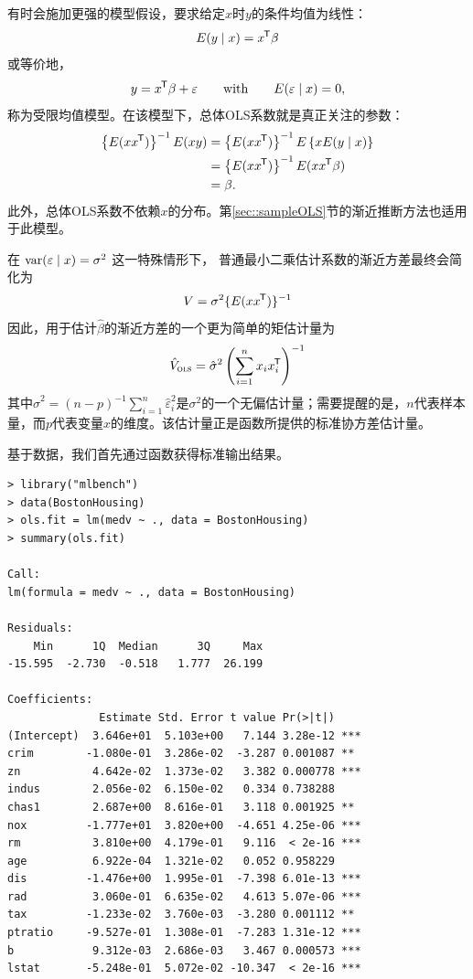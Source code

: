 有时会施加更强的模型假设，要求给定$x$时$y$的条件均值为线性：$$
E(y\mid x)=x ^{\mkern-1.5mu\mathsf{T}} \beta
$$或等价地，\[
y=x ^{\mkern-1.5mu\mathsf{T}} \beta+\varepsilon \qquad  \text{with} \qquad  E(\varepsilon\mid x)=0,
\]称为受限均值模型。在该模型下，总体OLS系数就是真正关注的参数：\begin{align*}
\left\{ E(xx ^{\mkern-1.5mu\mathsf{T}} )\right\} ^{-1}E(xy) & =\left\{ E(xx ^{\mkern-1.5mu\mathsf{T}} )\right\} ^{-1}E\left\{ xE(y\mid x)\right\} \\
 & =\left\{ E(xx ^{\mkern-1.5mu\mathsf{T}} )\right\} ^{-1}E(xx ^{\mkern-1.5mu\mathsf{T}} \beta)\\
 & =\beta.
\end{align*}此外，总体OLS系数不依赖$x$的分布。第\ref{sec::sampleOLS}节的渐近推断方法也适用于此模型。 



在 $\textup{var}(\varepsilon \mid x) = \sigma^2$ 这一特殊情形下， 
普通最小二乘估计系数的渐近方差最终会简化为$$
V = \sigma^2 \{ E(xx ^{\mkern-1.5mu\mathsf{T}} ) \}^{-1}
$$因此，用于估计$\hat{\beta}$的渐近方差的一个更为简单的矩估计量为\begin{equation}
\hat{V}_\textsc{ols} = \hat\sigma^2 \left( \sum_{i=1}^n x_{i}x_{i} ^{\mkern-1.5mu\mathsf{T}} \right)^{-1}
\label{eq::v-hat-ols}
\end{equation}其中$\hat\sigma^2 =  (n-p)^{-1}  \sum_{i=1}^n \hat{\varepsilon}_i^2$是$\sigma^2$的一个无偏估计量；需要提醒的是，$n$代表样本量，而$p$代表变量$x$的维度。该估计量正是函数所提供的标准协方差估计量。 




基于数据，我们首先通过函数获得标准输出结果。 

\begin{lstlisting}
> library("mlbench")
> data(BostonHousing)
> ols.fit = lm(medv ~ ., data = BostonHousing)
> summary(ols.fit)

Call:
lm(formula = medv ~ ., data = BostonHousing)

Residuals:
    Min      1Q  Median      3Q     Max 
-15.595  -2.730  -0.518   1.777  26.199 

Coefficients:
              Estimate Std. Error t value Pr(>|t|)    
(Intercept)  3.646e+01  5.103e+00   7.144 3.28e-12 ***
crim        -1.080e-01  3.286e-02  -3.287 0.001087 ** 
zn           4.642e-02  1.373e-02   3.382 0.000778 ***
indus        2.056e-02  6.150e-02   0.334 0.738288    
chas1        2.687e+00  8.616e-01   3.118 0.001925 ** 
nox         -1.777e+01  3.820e+00  -4.651 4.25e-06 ***
rm           3.810e+00  4.179e-01   9.116  < 2e-16 ***
age          6.922e-04  1.321e-02   0.052 0.958229    
dis         -1.476e+00  1.995e-01  -7.398 6.01e-13 ***
rad          3.060e-01  6.635e-02   4.613 5.07e-06 ***
tax         -1.233e-02  3.760e-03  -3.280 0.001112 ** 
ptratio     -9.527e-01  1.308e-01  -7.283 1.31e-12 ***
b            9.312e-03  2.686e-03   3.467 0.000573 ***
lstat       -5.248e-01  5.072e-02 -10.347  < 2e-16 ***
\end{lstlisting}


